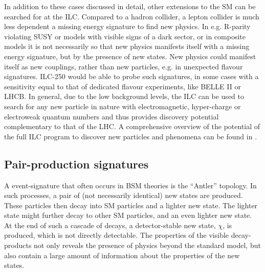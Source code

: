 In addition to these cases discussed in detail,
other extensions to the SM can be searched for at the ILC.
Compared to a hadron collider, a lepton collider is much less dependent 
a  missing energy signature to find new physics.
In e.g. R-parity violating SUSY 
or models with visible signs of a dark sector, or in composite models
it is not necessarily so that new physics manifests itself
with a  missing energy signature, but by the presence of
new states.
New physics could manifest itself as 
new couplings, rather than new particles, e.g. in unexpected
flavour signatures. 
ILC-250 would be able to probe such signatures,
in some cases with a sensitivity
equal to that of dedicated flavour experiments, like BELLE II 
or LHCB.
In general, due to the low background levels, 
the ILC can be used to search for any
new particle in nature with electromagnetic, hyper-charge or
electroweak quantum numbers and thus provides discovery potential
complementary to that of the LHC.
A comprehensive overview of the potential of
the full ILC program  to discover new particles and phenomena 
can be found in \cite{Fujii:2017ekh}.


\subsection{Pair-production signatures}
\label{subsec:searches_antlers}

A event-signature that often occurs in BSM theories is the
``Antler'' topology.
In such processes,
a pair of (not necessarily identical) new states are produced.
These particles then decay into SM particles and a lighter
new state. 
The lighter state might further decay to other SM particles,
and an even lighter new state.
At the end of such a cascade of decays,
a detector-stable new state,  $\chi$, is produced, 
which is not directly detectable.
The properties of the visible decay-products not only reveals the
presence of physics beyond the standard model, 
but also contain a large amount of information about the properties
of the new states.

